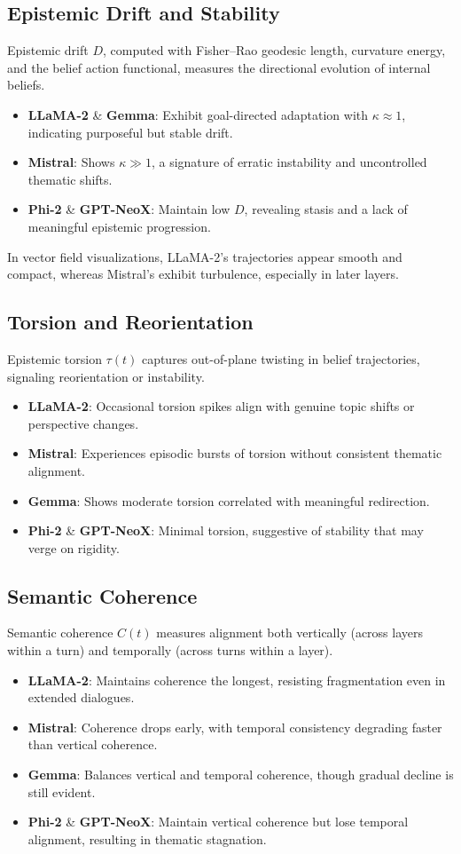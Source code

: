 \documentclass[11pt]{article}
\begin{document}
\subsection{Epistemic Drift and Stability}
Epistemic drift $D$, computed with Fisher--Rao geodesic length, curvature energy, and the belief action functional, measures the directional evolution of internal beliefs.
\begin{itemize}
    \item \textbf{LLaMA-2} \& \textbf{Gemma}: Exhibit goal-directed adaptation with $\kappa \approx 1$, indicating purposeful but stable drift.
    \item \textbf{Mistral}: Shows $\kappa \gg 1$, a signature of erratic instability and uncontrolled thematic shifts.
    \item \textbf{Phi-2} \& \textbf{GPT-NeoX}: Maintain low $D$, revealing stasis and a lack of meaningful epistemic progression.
\end{itemize}
In vector field visualizations, LLaMA-2’s trajectories appear smooth and compact, whereas Mistral’s exhibit turbulence, especially in later layers.

\subsection{Torsion and Reorientation}
Epistemic torsion $\tau(t)$ captures out-of-plane twisting in belief trajectories, signaling reorientation or instability.
\begin{itemize}
    \item \textbf{LLaMA-2}: Occasional torsion spikes align with genuine topic shifts or perspective changes.
    \item \textbf{Mistral}: Experiences episodic bursts of torsion without consistent thematic alignment.
    \item \textbf{Gemma}: Shows moderate torsion correlated with meaningful redirection.
    \item \textbf{Phi-2} \& \textbf{GPT-NeoX}: Minimal torsion, suggestive of stability that may verge on rigidity.
\end{itemize}

\subsection{Semantic Coherence}
Semantic coherence $C(t)$ measures alignment both vertically (across layers within a turn) and temporally (across turns within a layer).
\begin{itemize}
    \item \textbf{LLaMA-2}: Maintains coherence the longest, resisting fragmentation even in extended dialogues.
    \item \textbf{Mistral}: Coherence drops early, with temporal consistency degrading faster than vertical coherence.
    \item \textbf{Gemma}: Balances vertical and temporal coherence, though gradual decline is still evident.
    \item \textbf{Phi-2} \& \textbf{GPT-NeoX}: Maintain vertical coherence but lose temporal alignment, resulting in thematic stagnation.
\end{itemize}
\end{document}
